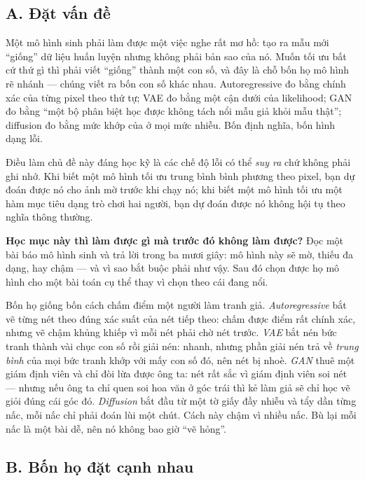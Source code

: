 \documentclass[../../../deep_learning.tex]{subfiles}
\begin{document}
\subsection{A. Đặt vấn đề}
Một mô hình sinh phải làm được một việc nghe rất mơ hồ: tạo ra mẫu mới ``giống'' dữ liệu huấn luyện nhưng không phải bản sao của nó. Muốn tối ưu bất cứ thứ gì thì phải viết ``giống'' thành một con số, và đây là chỗ bốn họ mô hình rẽ nhánh --- chúng viết ra bốn con số khác nhau. Autoregressive đo bằng  chính xác của từng pixel theo thứ tự; VAE đo bằng một cận dưới của likelihood; GAN đo bằng ``một bộ phân biệt học được không tách nổi mẫu giả khỏi mẫu thật''; diffusion đo bằng mức khớp của  ở mọi mức nhiễu. Bốn định nghĩa, bốn hình dạng lỗi.

Điều làm chủ đề này đáng học kỹ là các chế độ lỗi có thể \emph{suy ra} chứ không phải ghi nhớ. Khi biết một mô hình tối ưu trung bình bình phương theo pixel, bạn dự đoán được nó cho ảnh mờ trước khi chạy nó; khi biết một mô hình tối ưu một hàm mục tiêu dạng trò chơi hai người, bạn dự đoán được nó không hội tụ theo nghĩa thông thường.

\textbf{Học mục này thì làm được gì mà trước đó không làm được?} Đọc một bài báo mô hình sinh và trả lời trong ba mươi giây: mô hình này sẽ mờ, thiếu đa dạng, hay chậm --- và vì sao bắt buộc phải như vậy. Sau đó chọn được họ mô hình cho một bài toán cụ thể thay vì chọn theo cái đang nổi.

\begin{trucgiac}
Bốn họ giống bốn cách chấm điểm một người làm tranh giả. \emph{Autoregressive} bắt vẽ từng nét theo đúng xác suất của nét tiếp theo: chấm được điểm rất chính xác, nhưng vẽ chậm khủng khiếp vì mỗi nét phải chờ nét trước. \emph{VAE} bắt nén bức tranh thành vài chục con số rồi giải nén: nhanh, nhưng phần giải nén trả về \emph{trung bình} của mọi bức tranh khớp với mấy con số đó, nên nét bị nhoè. \emph{GAN} thuê một giám định viên và chỉ đòi lừa được ông ta: nét rất sắc vì giám định viên soi nét --- nhưng nếu ông ta chỉ quen soi hoa văn ở góc trái thì kẻ làm giả sẽ chỉ học vẽ giỏi đúng cái góc đó. \emph{Diffusion} bắt đầu từ một tờ giấy đầy nhiễu và tẩy dần từng nấc, mỗi nấc chỉ phải đoán lùi một chút. Cách này chậm vì nhiều nấc. Bù lại mỗi nấc là một bài dễ, nên nó không bao giờ ``vẽ hỏng''.
\end{trucgiac}

\subsection{B. Bốn họ đặt cạnh nhau}
\end{document}
